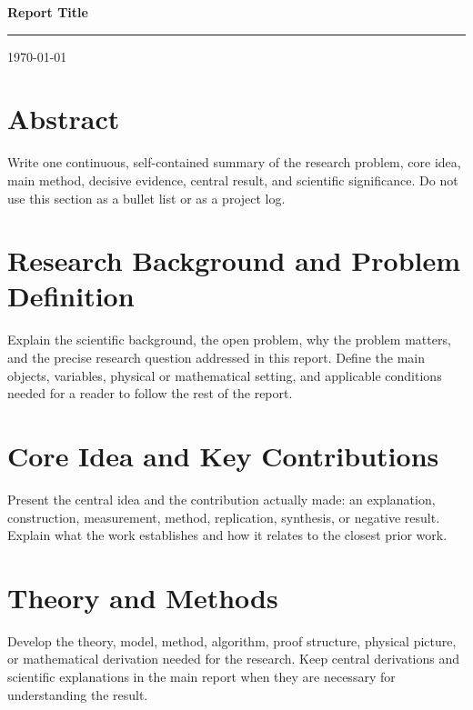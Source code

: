 \documentclass[11pt,a4paper]{article}
\providecommand{\ReportTitle}{Report Title}
\providecommand{\ReportSubtitle}{}
\providecommand{\ReportAuthor}{}
\providecommand{\ReportOrganization}{}
\providecommand{\ReportClassification}{}
\providecommand{\ReportVersion}{}
\providecommand{\ReportDate}{\today}
\providecommand{\MakeReportCover}{%
  \begin{titlepage}
  \pagecolor{ReportPrimary}\afterpage{\nopagecolor}
  \color{white}
  \vspace*{2.5cm}
  \begin{flushleft}
    {\Huge\bfseries \ReportTitle\par}\vspace{0.6cm}
    \ifdefempty{\ReportSubtitle}{}{{\Large\color{ReportLight}\ReportSubtitle\par}\vspace{1.5cm}}
    {\color{ReportLight}\rule{6cm}{0.6pt}}
  \end{flushleft}
  \vfill
  \begin{flushleft}
    \ifdefempty{\ReportAuthor}{}{{\large \ReportAuthor\par}\vspace{0.2cm}}
    \ifdefempty{\ReportOrganization}{}{{\normalsize\color{ReportLight}\ReportOrganization\par}\vspace{0.6cm}}
    {\normalsize\color{ReportLight}\ReportDate\par}\vspace{0.4cm}
    \ifdefempty{\ReportClassification}{}{{\small\color{ReportLight}Classification: \ReportClassification\par}}
    \ifdefempty{\ReportVersion}{}{{\small\color{ReportLight}\ReportVersion\par}}
  \end{flushleft}
  \end{titlepage}}
\begin{document}
\hypersetup{pageanchor=false}
\MakeReportCover
\hypersetup{pageanchor=true}
\setcounter{page}{1}

\thispagestyle{plain}
\tableofcontents
\newpage

\section*{Abstract}

Write one continuous, self-contained summary of the research problem, core idea,
main method, decisive evidence, central result, and scientific significance. Do
not use this section as a bullet list or as a project log.

\newpage

\section{Research Background and Problem Definition}

Explain the scientific background, the open problem, why the problem matters,
and the precise research question addressed in this report. Define the main
objects, variables, physical or mathematical setting, and applicable conditions
needed for a reader to follow the rest of the report.

\section{Core Idea and Key Contributions}

Present the central idea and the contribution actually made: an explanation,
construction, measurement, method, replication, synthesis, or negative result.
Explain what the work establishes and how it relates to the closest prior work.

\section{Theory and Methods}

Develop the theory, model, method, algorithm, proof structure, physical picture,
or mathematical derivation needed for the research. Keep central derivations and
scientific explanations in the main report when they are necessary for
understanding the result.

\end{document}
